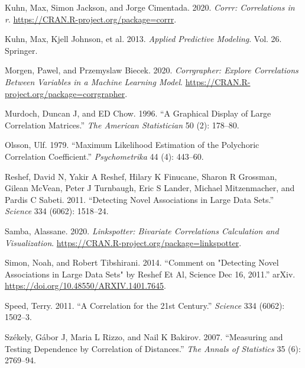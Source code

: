 \begin{CSLReferences}{1}{0}
\leavevmode{}%
Kuhn, Max, Simon Jackson, and Jorge Cimentada. 2020. \emph{Corrr: Correlations in r}. \url{https://CRAN.R-project.org/package=corrr}.

\leavevmode{}%
Kuhn, Max, Kjell Johnson, et al. 2013. \emph{Applied Predictive Modeling}. Vol. 26. Springer.

\leavevmode{}%
Morgen, Pawel, and Przemyslaw Biecek. 2020. \emph{Corrgrapher: Explore Correlations Between Variables in a Machine Learning Model}. \url{https://CRAN.R-project.org/package=corrgrapher}.

\leavevmode{}%
Murdoch, Duncan J, and ED Chow. 1996. {``A Graphical Display of Large Correlation Matrices.''} \emph{The American Statistician} 50 (2): 178--80.

\leavevmode{}%
Olsson, Ulf. 1979. {``Maximum Likelihood Estimation of the Polychoric Correlation Coefficient.''} \emph{Psychometrika} 44 (4): 443--60.

\leavevmode{}%
Reshef, David N, Yakir A Reshef, Hilary K Finucane, Sharon R Grossman, Gilean McVean, Peter J Turnbaugh, Eric S Lander, Michael Mitzenmacher, and Pardis C Sabeti. 2011. {``Detecting Novel Associations in Large Data Sets.''} \emph{Science} 334 (6062): 1518--24.

\leavevmode{}%
Samba, Alassane. 2020. \emph{Linkspotter: Bivariate Correlations Calculation and Visualization}. \url{https://CRAN.R-project.org/package=linkspotter}.

\leavevmode{}%
Simon, Noah, and Robert Tibshirani. 2014. {``Comment on "Detecting Novel Associations in Large Data Sets" by Reshef Et Al, Science Dec 16, 2011.''} arXiv. \url{https://doi.org/10.48550/ARXIV.1401.7645}.

\leavevmode{}%
Speed, Terry. 2011. {``A Correlation for the 21st Century.''} \emph{Science} 334 (6062): 1502--3.

\leavevmode{}%
Székely, Gábor J, Maria L Rizzo, and Nail K Bakirov. 2007. {``Measuring and Testing Dependence by Correlation of Distances.''} \emph{The Annals of Statistics} 35 (6): 2769--94.


\end{CSLReferences}
